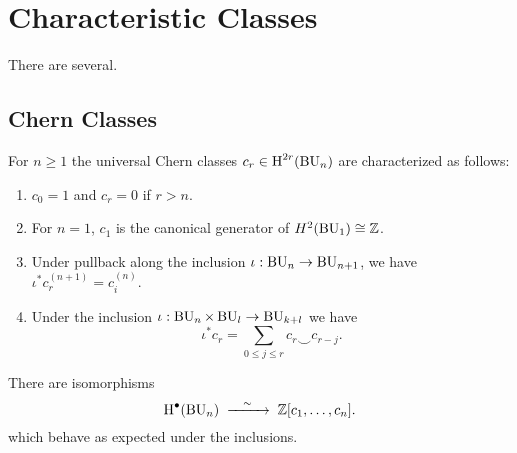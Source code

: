 \chapter{Characteristic Classes}

There are several.

\section{Chern Classes}

\begin{definition}
  For $n\geq 1$ the universal Chern classes $c_r \in \operatorname{H}^{2r}(\operatorname{BU}_n)$
  are characterized as follows:
  \begin{enumerate}
    \item $c_0 = 1$ and $c_r = 0$ if $r > n$.
    \item For $n=1$, $c_1$ is the canonical generator of $H^2(\operatorname{BU}_1)\cong \mathbb{Z}$.
    \item Under pullback along the inclusion $\iota : \operatorname{BU}_n \to \operatorname{BU}_{n+1}$, we have $\iota^* c_r^{(n+1)} = c_i^{(n)}$.
    \item Under the inclusion $\iota : \operatorname{BU}_n\times \operatorname{BU}_l \to \operatorname{BU}_{k+l}$ we have 
      \[
        \iota^* c_r = \sum_{0\leq j \leq r} c_r \smile c_{r-j}.
      \]
  \end{enumerate}
\end{definition}

\begin{proposition}
  There are isomorphisms
  \[
    \H^\bullet(\BU_n) \lkxisom \Z[c_1, \ldots, c_n].
  \]
  which behave as expected under the inclusions.
\end{proposition}

